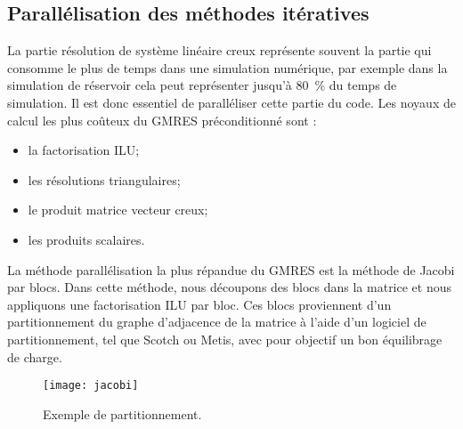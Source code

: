 \subsection{Parallélisation des méthodes itératives}
La partie résolution de système linéaire creux représente souvent la partie qui consomme le plus de temps dans une simulation numérique, par exemple dans la simulation de réservoir cela peut représenter jusqu'à 80~\% du temps de simulation.
%
Il est donc essentiel de paralléliser cette partie du code.
%
Les noyaux de calcul les plus coûteux du GMRES préconditionné sont :
\begin{itemize}
  \item la factorisation ILU;
  \item les résolutions triangulaires;
  \item le produit matrice vecteur creux;
  \item les produits scalaires.
\end{itemize}

La méthode parallélisation la plus répandue du GMRES est la méthode de Jacobi par blocs.
%
Dans cette méthode, nous découpons des blocs dans la matrice et nous appliquons une factorisation ILU par bloc.
%
Ces blocs proviennent d'un partitionnement du graphe d'adjacence de la matrice à l'aide d'un logiciel de partitionnement, tel que Scotch ou Metis, avec pour objectif un bon équilibrage de charge.

\begin{figure}[!h]
  \centering
  \texttt{[image: jacobi]}
  \caption{Exemple de partitionnement.}
  \label{fig:jacobi}
\end{figure}
